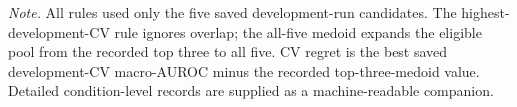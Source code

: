 

{\footnotesize\noindent\textit{Note.} All rules used only the five saved development-run candidates. The highest-development-CV rule ignores overlap; the all-five medoid expands the eligible pool from the recorded top three to all five. CV regret is the best saved development-CV macro-AUROC minus the recorded top-three-medoid value. Detailed condition-level records are supplied as a machine-readable companion.\par}




